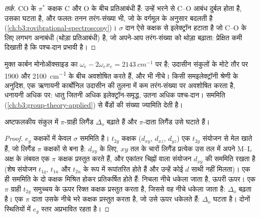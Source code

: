 \begin{proof}[तर्क]
CO के $\pi^*$ कक्षक C और O के बीच प्रतिआबंधी हैं: उन्हें भरने से
C--O आबंध दुर्बल होता है, उसका  घटता है, और फलतः तनन तरंग-संख्या भी, जो
 के वर्गमूल के अनुसार बदलती है (\cref{ch:b3:rovibrational-spectroscopy})।
$\sigma$ दान ऐसे कक्षक से इलेक्ट्रॉन हटाता है जो C--O के लिए लगभग अनाबंधी (थोड़ा
प्रतिआबंधी) है, जो अपने-आप तरंग-संख्या को थोड़ा बढ़ाता: प्रेक्षित
कमी दिखाती है कि पश्च-दान प्रभावी है।
\end{proof}

मुक्त कार्बन मोनोऑक्साइड का  $\omega_e - 2\omega_ex_e = \qty{2143}{cm^{-1}}$ पर है; उदासीन संकुलों के  मोटे तौर पर 1900 और \qty{2100}{cm^{-1}} के बीच अवशोषित करते हैं,
 और भी नीचे। किसी समइलेक्ट्रॉनी श्रेणी के अनुदिश, एक ऋणायनी
कार्बोनिल उदासीन की तुलना में कम तरंग-संख्या पर अवशोषित करता है, धनायनी
अधिक पर: धातु जितनी अधिक इलेक्ट्रॉन-समृद्ध, उतना अधिक पश्च-दान। सममिति (\cref{ch:b3:group-theory-applied}) से
बैंडों की संख्या ज्यामिति देती है।

\begin{proposition}[$\pi$ अन्योन्यक्रियाएँ और लिगैंड-क्षेत्र विपाटन]\label{prop:b3:organometallic-bonding:pi-delta}
अष्टफलकीय संकुल में $\pi$-ग्राही लिगैंड $\Delta_{\mathrm o}$ बढ़ाते हैं और $\pi$-दाता लिगैंड
उसे घटाते हैं।
\end{proposition}

\begin{proof}
$e_g$ कक्षकों में केवल $\sigma$ सममिति है। $t_{2g}$ कक्षक ($d_{xy}$, $d_{xz}$, $d_{yz}$) एक $t_{2g}$ संयोजन से मेल खाते हैं,
जो लिगैंड $\pi$ कक्षकों से बना है: $d_{xy}$ के लिए, $xy$ तल के चारों लिगैंड प्रत्येक
उस तल में अपने M--L अक्ष के लंबवत एक $\pi$ कक्षक प्रस्तुत करते हैं, और
एकांतर चिह्नों वाला संयोजन $d_{xy}$ की सममिति रखता है (शेष
संयोजन $t_{1g}$, $t_{1u}$ और $t_{2u}$ के रूप में रूपांतरित होते हैं और उन्हें कोई $d$ साथी नहीं मिलता)। एक ही
सममिति के दो कक्षक मिश्रित होकर प्रतिकर्षित होते हैं: निचला नीचे धकेला जाता है, ऊपरी ऊपर। एक
$\pi$ ग्राही $t_{2g}$ समुच्चय के ऊपर रिक्त कक्षक प्रस्तुत करता है, जिससे वह नीचे धकेला जाता है: $\Delta_{\mathrm o}$
बढ़ता है। एक $\pi$ दाता उसके नीचे भरे कक्षक प्रस्तुत करता है, जो उसे ऊपर धकेलते हैं: $\Delta_{\mathrm o}$
घटता है। दोनों स्थितियों में $e_g$ स्तर अप्रभावित रहता है।
\end{proof}

